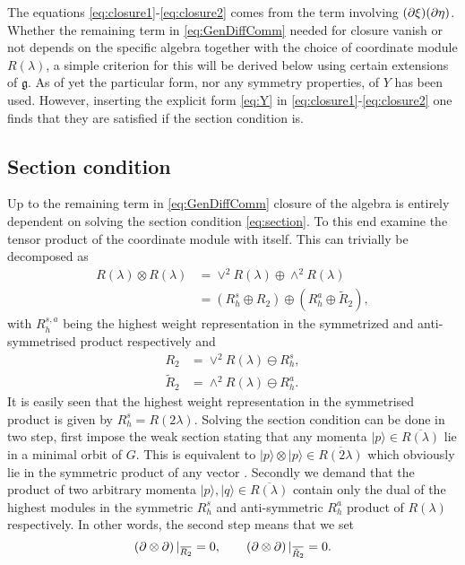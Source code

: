 The equations \eqref{eq:closure1}-\eqref{eq:closure2} comes from the term involving $(\partial\xi)(\partial\eta)$. Whether the remaining term in \eqref{eq:GenDiffComm} needed for closure vanish or not depends on the specific algebra together with the choice of coordinate module $R(\lambda)$, a simple criterion for this will be derived below using certain extensions of $\mathfrak{g}$. As of yet the particular form, nor any symmetry properties, of $Y$ has been used. However, inserting the explicit form \eqref{eq:Y} in \eqref{eq:closure1}-\eqref{eq:closure2} one finds that they are satisfied if the section condition is. 

\subsection{Section condition}
Up to the remaining term in \eqref{eq:GenDiffComm} closure of the algebra is entirely dependent on solving the section condition \eqref{eq:section}. To this end examine the tensor product of the coordinate module with itself. This can trivially be decomposed as
\begin{equation}\label{eq:SectionConditionReps}
    \begin{aligned}
        R(\lambda)\otimes R(\lambda) &= \vee^2 R(\lambda)\oplus \wedge^2R(\lambda)\\
        &= \left(R_h^s\oplus R_2\right)\oplus\left(R_h^a\oplus \tilde{R}_2\right),
    \end{aligned}
\end{equation}
with $R_h^{s,a}$ being the highest weight representation in the symmetrized and anti-symmetrised product respectively and
\begin{align}
    R_2 &= \vee^2 R(\lambda)\ominus R_h^s,\\
    \tilde{R}_2 &= \wedge^2R(\lambda)\ominus  R_h^a.
\end{align}
It is easily seen that the highest weight representation in the symmetrised product is given by $R_h^s=R(2\lambda)$. Solving the section condition can be done in two step, first impose the weak section stating that any momenta $|p\rangle\in \overbar{R(\lambda)}$ lie in a minimal orbit of $G$. This is equivalent to $|p\rangle\otimes|p\rangle \in \overbar{R(2\lambda)}$ which obviously lie in the symmetric product of any vector \cite{Berman2013,Bossard2017}. Secondly we demand that the product of two arbitrary momenta $|p\rangle,|q\rangle\in\overbar{R(\lambda)}$ contain only the dual of the highest modules in the symmetric $R^s_h$ and anti-symmetric $R^a_h$ product of $R(\lambda)$ respectively. In other words, the second step means that we set 
\begin{equation}
    \left(\pd\otimes\pd\right)|_{\overbar{R_2}} = 0, \qquad \left(\pd\otimes\pd\right)|_{\overbar{\tilde{R}_2}} =0.
\end{equation}

